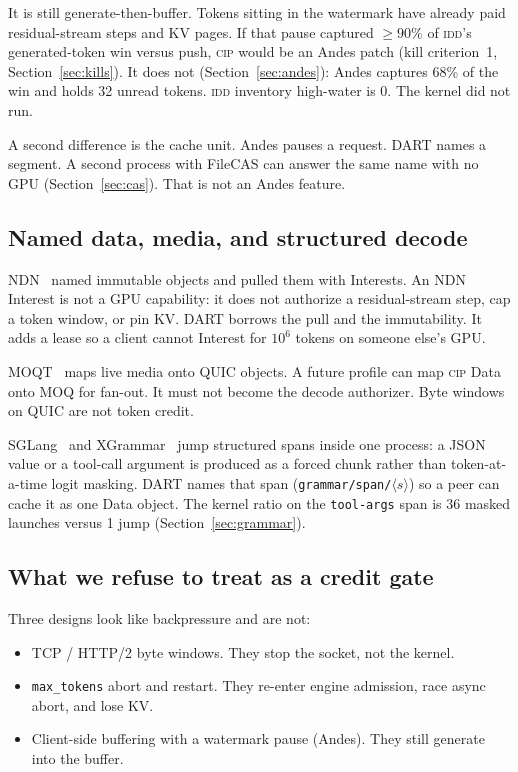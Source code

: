 \documentclass{article}
\theoremstyle{definition}
\newcommand{\cip}{\textsc{cip}}
\newcommand{\idd}{\textsc{idd}}
\begin{document}
It is still generate-then-buffer.
Tokens sitting in the watermark have already paid residual-stream steps and KV pages.
If that pause captured $\ge 90\%$ of \idd{}'s generated-token win versus push, \cip{} would be an Andes patch (kill criterion~1, Section~\ref{sec:kills}).
It does not (Section~\ref{sec:andes}): Andes captures 68\% of the win and holds 32 unread tokens.
\idd{} inventory high-water is 0.
The kernel did not run.

A second difference is the cache unit.
Andes pauses a request.
DART names a segment.
A second process with FileCAS can answer the same name with no GPU (Section~\ref{sec:cas}).
That is not an Andes feature.

\subsection{Named data, media, and structured decode}

NDN~\citep{jacobson2009ndn} named immutable objects and pulled them with Interests.
An NDN Interest is not a GPU capability: it does not authorize a residual-stream step, cap a token window, or pin KV.
DART borrows the pull and the immutability.
It adds a lease so a client cannot Interest for $10^6$ tokens on someone else's GPU.

MOQT~\citep{ietf-moqt} maps live media onto QUIC objects.
A future profile can map \cip{} Data onto MOQ for fan-out.
It must not become the decode authorizer.
Byte windows on QUIC are not token credit.

SGLang~\citep{zheng2024sglang} and XGrammar~\citep{dong2024xgrammar} jump structured spans inside one process: a JSON value or a tool-call argument is produced as a forced chunk rather than token-at-a-time logit masking.
DART names that span (\texttt{grammar/span/}$\langle s\rangle$) so a peer can cache it as one Data object.
The kernel ratio on the \texttt{tool-args} span is 36 masked launches versus 1 jump (Section~\ref{sec:grammar}).

\subsection{What we refuse to treat as a credit gate}

Three designs look like backpressure and are not:

\begin{itemize}[leftmargin=1.4em,itemsep=1pt]
\item TCP / HTTP/2 byte windows. They stop the socket, not the kernel.
\item \texttt{max\_tokens} abort and restart. They re-enter engine admission, race async abort, and lose KV.
\item Client-side buffering with a watermark pause (Andes). They still generate into the buffer.
\end{itemize}
\end{document}
